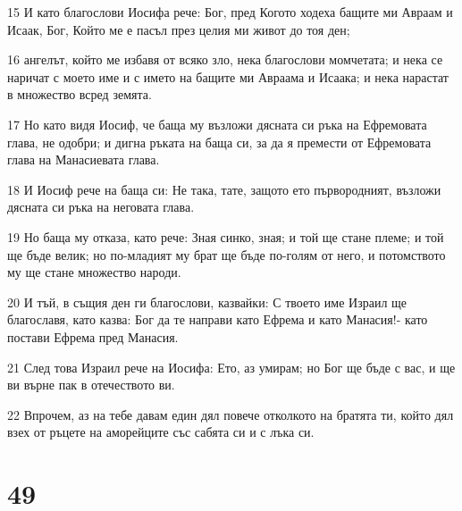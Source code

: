 \par 15 И като благослови Иосифа рече: Бог, пред Когото ходеха бащите ми Авраам и Исаак, Бог, Който ме е пасъл през целия ми живот до тоя ден;
\par 16 ангелът, който ме избавя от всяко зло, нека благослови момчетата; и нека се наричат с моето име и с името на бащите ми Авраама и Исаака; и нека нарастат в множество всред земята.
\par 17 Но като видя Иосиф, че баща му възложи дясната си ръка на Ефремовата глава, не одобри; и дигна ръката на баща си, за да я премести от Ефремовата глава на Манасиевата глава.
\par 18 И Иосиф рече на баща си: Не така, тате, защото ето първородният, възложи дясната си ръка на неговата глава.
\par 19 Но баща му отказа, като рече: Зная синко, зная; и той ще стане племе; и той ще бъде велик; но по-младият му брат ще бъде по-голям от него, и потомството му ще стане множество народи.
\par 20 И тъй, в същия ден ги благослови, казвайки: С твоето име Израил ще благославя, като казва: Бог да те направи като Ефрема и като Манасия!- като постави Ефрема пред Манасия.
\par 21 След това Израил рече на Иосифа: Ето, аз умирам; но Бог ще бъде с вас, и ще ви върне пак в отечеството ви.
\par 22 Впрочем, аз на тебе давам един дял повече отколкото на братята ти, който дял взех от ръцете на аморейците със сабята си и с лъка си.

\chapter{49}

